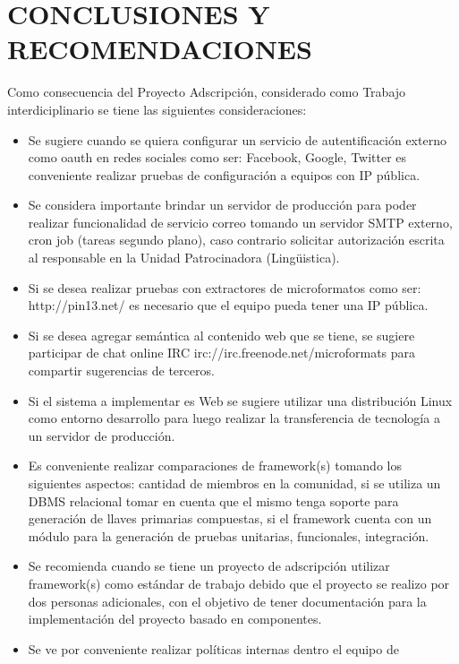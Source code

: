 \chapter{CONCLUSIONES Y RECOMENDACIONES}

Como consecuencia del Proyecto Adscripci\'{o}n, considerado como Trabajo 
interdiciplinario se tiene las siguientes consideraciones:

\begin{itemize}

\item Se sugiere cuando se quiera configurar un servicio de autentificaci\'{o}n
externo como oauth en redes sociales como ser: Facebook, Google, Twitter es
conveniente realizar pruebas de configuraci\'{o}n a equipos con IP p\'{u}blica.
\item Se considera importante brindar un servidor de producci\'{o}n para poder 
realizar funcionalidad de servicio correo tomando un servidor SMTP externo,
cron job (tareas segundo plano), caso contrario solicitar autorizaci\'{o}n 
escrita al responsable en la Unidad Patrocinadora (Ling\"{u}istica).
\item Si se desea realizar pruebas con extractores de microformatos como ser:
http://pin13.net/ es necesario que el equipo pueda tener una IP p\'{u}blica.
\item Si se desea agregar sem\'{a}ntica al contenido web que se tiene, se 
sugiere participar de chat online IRC irc://irc.freenode.net/microformats para
compartir sugerencias de terceros.
\item Si el sistema a implementar es Web se sugiere utilizar una distribuci\'{o}n
Linux como entorno desarrollo para luego realizar la transferencia de 
tecnolog\'{i}a a un servidor de producci\'{o}n.
\item Es conveniente realizar comparaciones de framework(s) tomando los siguientes
aspectos: cantidad de miembros en la comunidad, si se utiliza un DBMS relacional
tomar en cuenta que el mismo tenga soporte para generaci\'{o}n de llaves primarias
compuestas, si el framework cuenta con un m\'{o}dulo para la generaci\'{o}n de pruebas
unitarias, funcionales, integraci\'{o}n.
\item Se recomienda cuando se tiene un proyecto de adscripci\'{o}n utilizar
framework(s) como est\'{a}ndar de trabajo debido que el proyecto se realizo por
dos personas adicionales, con el objetivo de tener documentaci\'{o}n para la 
implementaci\'{o}n del proyecto basado en componentes.
\item Se ve por conveniente realizar pol\'{i}ticas internas dentro el equipo de

\end{itemize}

